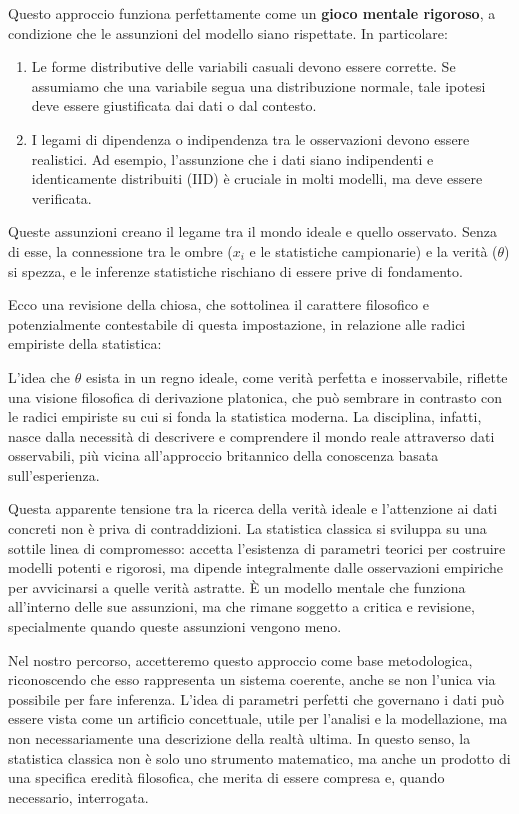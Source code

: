 \documentclass[
  11pt,
]{book}
\providecommand{\tightlist}{%
  \setlength{\itemsep}{0pt}\setlength{\parskip}{0pt}}
\theoremstyle{mytheoremstyle}
\theoremstyle{mydefstyle}
\begin{document}
Questo approccio funziona perfettamente come un \textbf{gioco mentale rigoroso}, a condizione che le assunzioni del modello siano rispettate. In particolare:

\begin{enumerate}
\def\labelenumi{\arabic{enumi}.}
\tightlist
\item
  Le forme distributive delle variabili casuali devono essere corrette. Se assumiamo che una variabile segua una distribuzione normale, tale ipotesi deve essere giustificata dai dati o dal contesto.
\item
  I legami di dipendenza o indipendenza tra le osservazioni devono essere realistici. Ad esempio, l'assunzione che i dati siano indipendenti e identicamente distribuiti (IID) è cruciale in molti modelli, ma deve essere verificata.
\end{enumerate}

Queste assunzioni creano il legame tra il mondo ideale e quello osservato. Senza di esse, la connessione tra le ombre (\(x_i\) e le statistiche campionarie) e la verità (\(\theta\)) si spezza, e le inferenze statistiche rischiano di essere prive di fondamento.

Ecco una revisione della chiosa, che sottolinea il carattere filosofico e potenzialmente contestabile di questa impostazione, in relazione alle radici empiriste della statistica:

L'idea che \(\theta\) esista in un regno ideale, come verità perfetta e inosservabile, riflette una visione filosofica di derivazione platonica, che può sembrare in contrasto con le radici empiriste su cui si fonda la statistica moderna. La disciplina, infatti, nasce dalla necessità di descrivere e comprendere il mondo reale attraverso dati osservabili, più vicina all'approccio britannico della conoscenza basata sull'esperienza.

Questa apparente tensione tra la ricerca della verità ideale e l'attenzione ai dati concreti non è priva di contraddizioni. La statistica classica si sviluppa su una sottile linea di compromesso: accetta l'esistenza di parametri teorici per costruire modelli potenti e rigorosi, ma dipende integralmente dalle osservazioni empiriche per avvicinarsi a quelle verità astratte. È un modello mentale che funziona all'interno delle sue assunzioni, ma che rimane soggetto a critica e revisione, specialmente quando queste assunzioni vengono meno.

Nel nostro percorso, accetteremo questo approccio come base metodologica, riconoscendo che esso rappresenta un sistema coerente, anche se non l'unica via possibile per fare inferenza. L'idea di parametri perfetti che governano i dati può essere vista come un artificio concettuale, utile per l'analisi e la modellazione, ma non necessariamente una descrizione della realtà ultima. In questo senso, la statistica classica non è solo uno strumento matematico, ma anche un prodotto di una specifica eredità filosofica, che merita di essere compresa e, quando necessario, interrogata.
\end{document}
